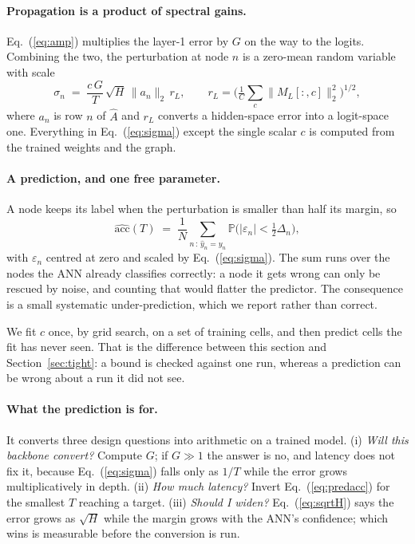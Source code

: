 \documentclass[10pt,twocolumn]{article}
\newcommand{\Ahat}{\hat{A}}
\newcommand{\Deltan}{\Delta_{n}}
\newcommand{\secref}[1]{Section~\ref{#1}}
\newcommand{\eqnref}[1]{Eq.~(\ref{#1})}
\begin{document}
\paragraph{Propagation is a product of spectral gains.}
\eqnref{eq:amp} multiplies the layer-1 error by $G$ on the way to the logits. Combining the two, the
perturbation at node $n$ is a zero-mean random variable with scale
\begin{equation}
\sigma_{n} \;=\; \frac{c\,G}{T}\,\sqrt{H}\,\lVert a_{n}\rVert_{2}\,r_{L},
\qquad r_{L}=\Big(\tfrac{1}{C}\sum_{c}\lVert M_{L}[:,c]\rVert_{2}^{2}\Big)^{1/2},
\label{eq:sigma}
\end{equation}
where $a_{n}$ is row $n$ of $\Ahat$ and $r_{L}$ converts a hidden-space error into a logit-space one.
Everything in \eqnref{eq:sigma} except the single scalar $c$ is computed from the trained weights and
the graph.

\paragraph{A prediction, and one free parameter.}
A node keeps its label when the perturbation is smaller than half its margin, so
\begin{equation}
\widehat{\mathrm{acc}}(T) \;=\; \frac{1}{N}\sum_{n\,:\,\hat{y}_{n}=y_{n}}
\mathbb{P}\big(|\varepsilon_{n}|<\tfrac{1}{2}\Deltan\big),
\label{eq:predacc}
\end{equation}
with $\varepsilon_{n}$ centred at zero and scaled by \eqnref{eq:sigma}. The sum runs over the nodes the
ANN already classifies correctly: a node it gets wrong can only be rescued by noise, and counting that
would flatter the predictor. The consequence is a small systematic under-prediction, which we report
rather than correct.

We fit $c$ once, by grid search, on a set of training cells, and then predict cells the fit has never
seen. That is the difference between this section and \secref{sec:tight}: a bound is checked against
one run, whereas a prediction can be wrong about a run it did not see.

\paragraph{What the prediction is for.}
It converts three design questions into arithmetic on a trained model. (i) \emph{Will this backbone
convert?} Compute $G$; if $G\gg1$ the answer is no, and latency does not fix it, because
\eqnref{eq:sigma} falls only as $1/T$ while the error grows multiplicatively in depth. (ii) \emph{How
much latency?} Invert \eqnref{eq:predacc} for the smallest $T$ reaching a target. (iii) \emph{Should I
widen?} \eqnref{eq:sqrtH} says the error grows as $\sqrt{H}$ while the margin grows with the ANN's
confidence; which wins is measurable before the conversion is run.
\end{document}
